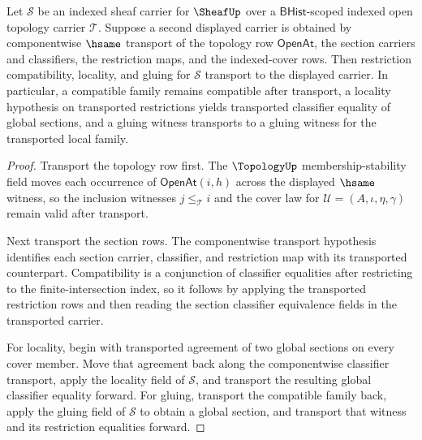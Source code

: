 \begin{theorem}
\label{thm:sheaf-restriction-hsame-transport-obligation}
Let $\mathcal{S}$ be an indexed sheaf carrier for $\SheafUp$ over a $\mathsf{BHist}$-scoped indexed open topology carrier $\mathcal{T}$. Suppose a second displayed carrier is obtained by componentwise $\hsame$ transport of the topology row $\mathsf{OpenAt}$, the section carriers and classifiers, the restriction maps, and the indexed-cover rows. Then restriction compatibility, locality, and gluing for $\mathcal{S}$ transport to the displayed carrier. In particular, a compatible family remains compatible after transport, a locality hypothesis on transported restrictions yields transported classifier equality of global sections, and a gluing witness transports to a gluing witness for the transported local family.
\end{theorem}
\begin{proof}
Transport the topology row first. The $\TopologyUp$ membership-stability field moves each occurrence of $\mathsf{OpenAt}(i,h)$ across the displayed $\hsame$ witness, so the inclusion witnesses $j\le_{\mathcal{T}}i$ and the cover law for $\mathcal{U}=(A,\iota,\eta,\gamma)$ remain valid after transport.

Next transport the section rows. The componentwise transport hypothesis identifies each section carrier, classifier, and restriction map with its transported counterpart. Compatibility is a conjunction of classifier equalities after restricting to the finite-intersection index, so it follows by applying the transported restriction rows and then reading the section classifier equivalence fields in the transported carrier.

For locality, begin with transported agreement of two global sections on every cover member. Move that agreement back along the componentwise classifier transport, apply the locality field of $\mathcal{S}$, and transport the resulting global classifier equality forward. For gluing, transport the compatible family back, apply the gluing field of $\mathcal{S}$ to obtain a global section, and transport that witness and its restriction equalities forward.
\end{proof}

